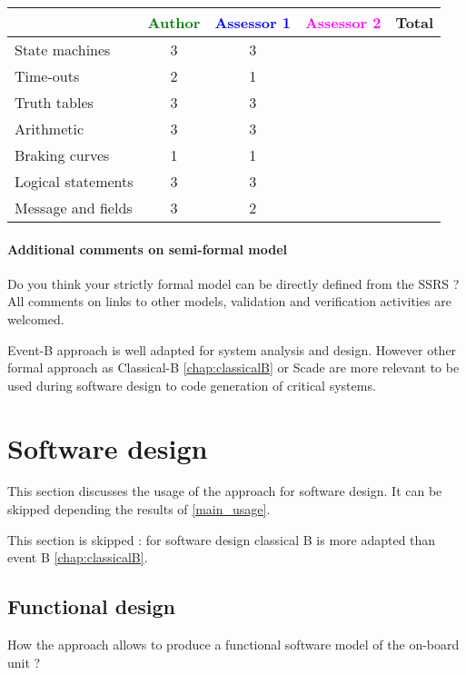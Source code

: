 \begin{tabular}{|l | c | c | c | c|}
\hline
& \textcolor{green}{Author} & \textcolor{blue}{Assessor 1} & \textcolor{magenta}{Assessor 2} & Total \\
\hline 
State machines  & 3 & 3 & &  \\
\hline
Time-outs  & 2 & 1 & &  \\
\hline
Truth tables  & 3 & 3 & &  \\
\hline
Arithmetic  & 3 & 3 & &  \\
\hline
Braking curves  & 1 & 1 & &  \\
\hline
Logical statements & 3 & 3 & &  \\
\hline
Message and fields & 3 & 2 & &  \\
\hline
\end{tabular}

\paragraph{Additional comments on semi-formal  model} Do you think your strictly formal  model can be directly defined from the SSRS ?
All comments on links to  other models, validation and verification activities are welcomed.


\begin{author_comment}
Event-B  approach is well adapted for system analysis and design. However other formal approach as Classical-B \ref{chap:classicalB} or Scade are more relevant to be used during software design to code generation of critical systems.
\end{author_comment}


\section{Software design}
This section discusses the usage of the approach for software design.
It can be skipped depending the results of \ref{main_usage}.


\begin{author_comment}
This section is skipped :  for software design classical B is more adapted than event B \ref{chap:classicalB}.
\end{author_comment}


\subsection{Functional design}


How the approach allows to  produce a functional software model of the on-board unit ?

